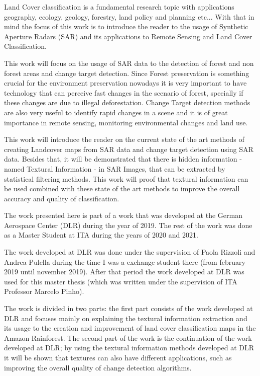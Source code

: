 Land Cover classification is a fundamental research topic with applications geography,
ecology, geology, forestry, land policy and planning etc... 
With that in mind the focus of this work is to introduce the reader to the usage of Synthetic Aperture Radars (SAR) 
and its applications to Remote Sensing and Land Cover Classification. 

This work will focus on the usage of SAR data to the detection of forest and non forest areas and change target detection. 
Since Forest preservation is something crucial for the environment preservation nowadays it is very important to have technology 
that can perceive fast changes in the scenario of forest, specially if these changes are due to illegal deforestation. 
Change Target detection methods are also very useful to identify rapid changes in a scene and it is of great importance in remote sensing, monitoring environmental changes and land use. 

This work will introduce the reader on the current state of the art methods of creating Landcover 
maps from SAR data and change target detection using SAR data. Besides that, it will be demonstrated that there is hidden information - named Textural Information - in SAR Images, that can be 
extracted by statistical filtering methods. This work will proof that textural information can be used combined with these state of the art methods to improve the overall accuracy and quality of classification.  

The work presented here is part of a work that was developed at the German Aerospace Center (DLR) 
during the year of 2019. The rest of the work was done as a Master Student at ITA during the years of 2020 and 2021.

The work developed at DLR was done under the supervision of Paola Rizzoli and Andrea Pulella 
during the time I was a exchange student there (from february 2019 until november 2019). 
After that period the work developed at DLR was used for this master thesis 
(which was written under the supervision of ITA Professor Marcelo Pinho).

The work is divided in two parts: the first part consists of the work developed at DLR and focuses mainly on explaining the textural information extraction and its usage to the 
creation and improvement of land cover classification maps in the Amazon Rainforest. The second part of the work is the continuation of the work developed at DLR; by using the textural 
information methods developed at DLR it will be shown that textures can also have different applications, such as improving the overall quality of change detection algorithms. 

